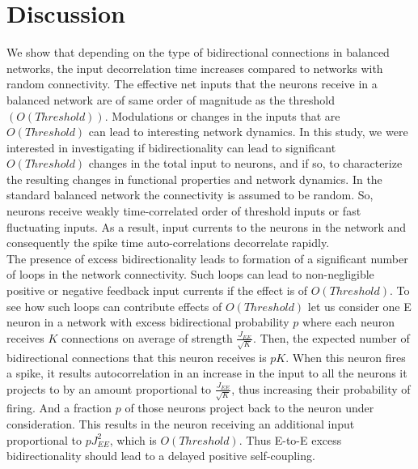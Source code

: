 \section{Discussion}
We show that depending on the type of bidirectional connections in balanced networks, the input decorrelation time increases compared to networks with random connectivity. The effective net inputs that the neurons receive in a balanced network are of same order of magnitude as the threshold $\left( O(Threshold) \right)$. Modulations or changes in the inputs that are $O(Threshold)$ can lead to interesting network dynamics. In this study, we were interested in investigating if bidirectionality can lead to significant $O(Threshold)$ changes in the total input to neurons, and if so, to characterize the resulting changes in functional properties and network dynamics. In the standard balanced network the connectivity is assumed to be random. So, neurons receive weakly time-correlated order of threshold inputs or fast fluctuating inputs. As a result, input currents to the neurons in the network and consequently the spike time auto-correlations decorrelate rapidly\cite{carl1996, carl1998}. \\
The presence of excess bidirectionality leads to formation of a significant number of loops in the network connectivity. Such loops can lead to non-negligible positive or negative feedback input currents if the effect is of $O(Threshold)$. To see how such loops can contribute effects of $O(Threshold)$ let us consider one E neuron in a network with excess bidirectional probability $p$ where each neuron receives $K$ connections on average of strength $\frac{J_{EE}}{\sqrt{K}}$. Then, the expected number of bidirectional connections that this neuron receives is $pK$. When this neuron fires a spike, it results autocorrelation in an increase in the input to all the neurons it projects to by an amount proportional to $\frac{J_{EE}}{\sqrt{K}}$, thus increasing their probability of firing. And a fraction $p$ of those neurons project back to the neuron under consideration. This results in the neuron receiving an additional input proportional to $p J_{EE}^{2}$, which is $O(Threshold)$. Thus E-to-E excess bidirectionality should lead to a delayed positive self-coupling. 

